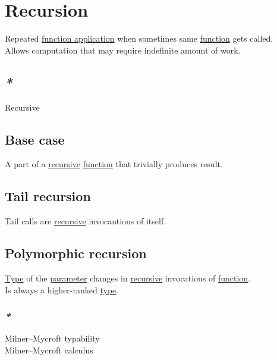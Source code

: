 \documentclass[a4paper,14pt,oneside]{book}
\begin{document}
\section{\label{org9c205bf}Recursion}
\label{sec:org06c08c3}
Repeated \hyperref[org0f77465]{function application} when sometimes same \hyperref[org8cc2ae4]{function} gets called.\\

Allows computation that may require indefinite amount of work.\\

\subsection{\emph{*}}
\label{sec:org589d182}

\label{org55cd81b}Recursive\\

\subsection{\label{org31f7d01}Base case}
\label{sec:orgd29f705}
A part of a \hyperref[org55cd81b]{recursive} \hyperref[org8cc2ae4]{function} that trivially produces result.\\

\subsection{\label{orgebcbf40}Tail recursion}
\label{sec:orga0cf2ef}
Tail calls are \hyperref[org55cd81b]{recursive} invocantions of itself.\\

\subsection{\label{orgae9ba88}Polymorphic recursion}
\label{sec:orga6064e3}
\hyperref[orgd6db20c]{Type} of the \hyperref[orged2015b]{parameter} changes in \hyperref[org55cd81b]{recursive} invocations of \hyperref[org8cc2ae4]{function}.\\

Is always a higher-ranked \hyperref[orgd6db20c]{type}.\\

\subsubsection{\emph{*}}
\label{sec:org24633e8}

\label{org21d88af}Milner–Mycroft typability\\
\label{orge6c9535}Milner–Mycroft calculus\\
\end{document}
